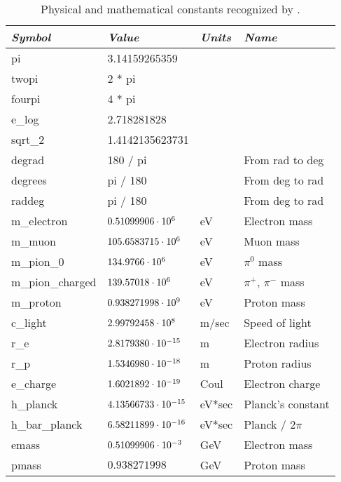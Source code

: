 \begin{table}
\centering
\begin{tabular}{|l|l|l|l|} \hline
  {\em Symbol}    & {\em Value}       & {\em Units}     &  {\em Name}           \\ \hline
  pi              & 3.14159265359          &            &                       \\
  twopi           & 2 * pi                 &            &                       \\
  fourpi          & 4 * pi                 &            &                       \\
  e_log           & 2.718281828            &            &                       \\
  sqrt_2          & 1.4142135623731        &            &                       \\
  degrad          & 180 / pi               &            & From rad to deg       \\
  degrees         & pi / 180               &            & From deg to rad       \\
  raddeg          & pi / 180               &            & From deg to rad       \\
  m_electron      & $0.51099906 \cdot 10^{6}$   & eV         & Electron mass         \\
  m_muon          & $105.6583715 \cdot 10^{6}$  & eV         & Muon mass             \\
  m_pion_0        & $134.9766 \cdot 10^{6}$     & eV         & $\pi^0$ mass          \\
  m_pion_charged  & $139.57018 \cdot 10^{6}$    & eV         & $\pi^+$, $\pi^-$ mass \\
  m_proton        & $0.938271998 \cdot 10^{9}$  & eV         & Proton mass           \\
  c_light         & $2.99792458 \cdot 10^{8}$   & m/sec      & Speed of light        \\
  r_e             & $2.8179380 \cdot 10^{-15}$  & m          & Electron radius       \\
  r_p             & $1.5346980 \cdot 10^{-18}$  & m          & Proton radius         \\
  e_charge        & $1.6021892 \cdot 10^{-19}$  & Coul       & Electron charge       \\
  h_planck        & $4.13566733 \cdot 10^{-15}$ & eV*sec     & Planck's constant     \\
  h_bar_planck    & $6.58211899 \cdot 10^{-16}$ & eV*sec     & Planck / $2\pi$       \\
  emass           & $0.51099906 \cdot 10^{-3}$  & GeV        & Electron mass         \\
  pmass           & $0.938271998$          & GeV        & Proton mass           \\ \hline
\end{tabular}
\caption{Physical and mathematical constants recognized by \bmad.}
\label{t:constants}
\end{table}

